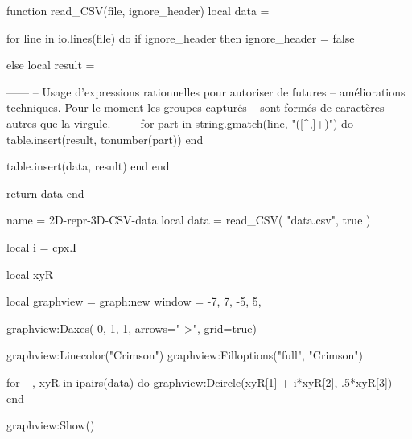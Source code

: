 \documentclass[varwidth]{standalone}
\begin{document}
\begin{luacode*}
function read_CSV(file, ignore_header)
  local data = {}

  for line in io.lines(file) do
    if ignore_header then
      ignore_header = false

    else
      local result = {}

------
-- Usage d'expressions rationnelles pour autoriser de futures
-- améliorations techniques. Pour le moment les groupes capturés
-- sont formés de caractères autres que la virgule.
------
      for part in string.gmatch(line, "([^,]+)") do
        table.insert(result, tonumber(part))
      end

      table.insert(data, result)
    end
  end

  return data
end
\end{luacode*}

\begin{luadraw}{name = 2D-repr-3D-CSV-data}
local data = read_CSV(
  "data.csv",
  true
)

local i = cpx.I

local xyR

local graphview = graph:new{
  window = {-7, 7, -5, 5},
}

graphview:Daxes(
  {0, 1, 1},
  {arrows="->", 
  grid=true})

graphview:Linecolor("Crimson")
graphview:Filloptions("full", "Crimson")
 
for _, xyR in ipairs(data) do
  graphview:Dcircle(xyR[1] + i*xyR[2], .5*xyR[3]) 
end

graphview:Show()
\end{luadraw}
\end{document}
